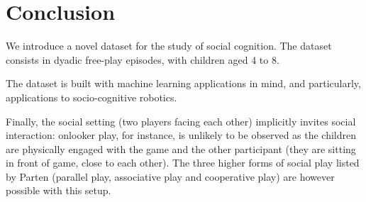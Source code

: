 \documentclass{article}
\begin{document}
%
%
%

\section{Conclusion}
%
%

We introduce a novel dataset for the study of social cognition. The dataset
consists in dyadic free-play episodes, with children aged 4 to 8.

The dataset is built with machine learning applications in mind, and
particularly, applications to socio-cognitive robotics.


Finally, the social setting (two players facing each other) implicitly invites
social interaction: onlooker play, for instance, is unlikely to be observed as
the children are physically engaged with the game and the other participant
(they are sitting in front of game, close to each other). The three higher forms
of social play listed by Parten (parallel play, associative play and cooperative
play) are however possible with this setup.



\end{document}
